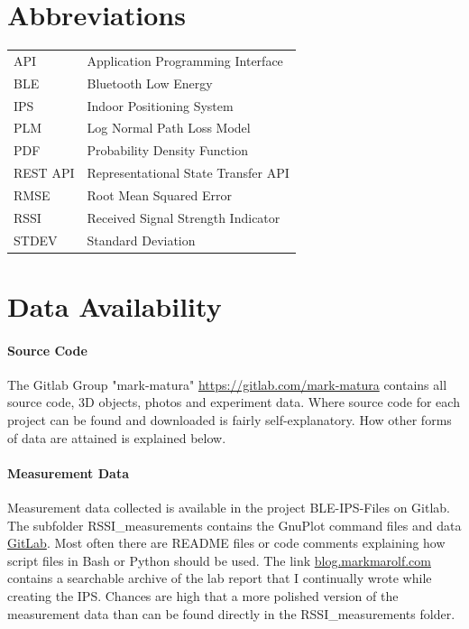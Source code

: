 \documentclass[a4paper, oneside]{ipsreport}
\begin{document}
\chapter{Abbreviations}
\begin{tabular}{ll}
	API & Application Programming Interface \\
	BLE & Bluetooth Low Energy \\
	IPS & Indoor Positioning System \\
	PLM & Log Normal Path Loss Model \\
	PDF & Probability Density Function \\
	REST API &  Representational State Transfer API \\
	RMSE & Root Mean Squared Error \\
	RSSI & Received Signal Strength Indicator \\
	STDEV & Standard Deviation \\
\end{tabular}

% 
% 
\printbibliography

\appendix
\chapter{Data Availability}

\subsubsection{Source Code}

The Gitlab Group "mark-matura" \href{https://gitlab.com/mark-matura}{https://gitlab.com/mark-matura} contains all source code, 3D objects, photos and experiment data. Where source code for each project can be found and downloaded is fairly self-explanatory. How other forms of data are attained is explained below.

\subsubsection{Measurement Data}
\label{appendix:rssimeasurementdata}
Measurement data collected is available in the project BLE-IPS-Files on Gitlab. The subfolder RSSI\_measurements contains the GnuPlot command files and data \href{https://gitlab.com/mark-matura/ble-ips-files/-/tree/master/RSSI_measurements}{GitLab}. Most often there are README files or code comments explaining how script files in Bash or Python should be used. The link \href{https://blog.markmarolf.com}{blog.markmarolf.com} contains a searchable archive of the lab report that I continually wrote while creating the IPS. Chances are high that a more polished version of the measurement data than can be found directly in the RSSI\_measurements folder.
\end{document}
